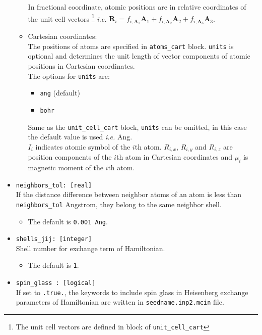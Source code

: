 \documentclass[10pt]{report}
\begin{document}
\begin{itemize}
\begin{itemize}
In fractional coordinate, atomic positions are in relative coordinates of the unit cell
vectors %
\footnote{The unit cell vectors are defined in block of {\tt unit\_cell\_cart} }
{\it i.e.} $\textbf{R}_i=f_{i,\textbf{A}_1}\textbf{A}_1+f_{i,\textbf{A}_2}\textbf{A}_2+f_{i,\textbf{A}_3}\textbf{A}_3$.  \\
\item {Cartesian coordinates:}\\
The positions of atoms are specified in {\tt atoms\_cart} block. 
{\tt units} is optional and determines the unit length of vector components of atomic positions in Cartesian coordinates.
\\The options for {\tt units} are:
\begin{itemize} [label=\adfhalfrightarrowhead]
\item {\tt ang}  (default)
\item {\tt bohr}
\end{itemize}
Same as the {\tt unit\_cell\_cart} block, {\tt units} can be omitted,
 in this case the default value is used {\it i.e.} Ang.\\
$I_{i}$ indicates atomic symbol of the $i$th atom. $R_{i,x}$, $R_{i,y}$ and $R_{i,z}$ are position components of the $i$th atom
in Cartesian coordinates and $\mu_{i} $ is magnetic moment of the $i$th atom.\\
\end{itemize}
\item {\tt neighbors\_tol: [real]}\\
If the distance difference between neighbor atoms of an atom is less than {\tt neighbors\_tol} Angstrom,
they belong to the same neighbor shell.
\begin{itemize} [label=\adfhalfrightarrowhead]
\item  The default is {\tt 0.001 Ang}.    
\end{itemize}
\item {\tt shells\_jij: [integer]}\\
Shell number for exchange term of Hamiltonian.
\begin{itemize} [label=\adfhalfrightarrowhead]
\item  The default is {\tt 1}.    
\end{itemize}
\item {\tt spin\_glass  : [logical]}\\
If set to {\tt .true.}, the keywords to include spin glass in Heisenberg exchange parameters of Hamiltonian 
 are written in {\tt seedname.inp2.mcin} file.

\end{itemize}
\end{document}
